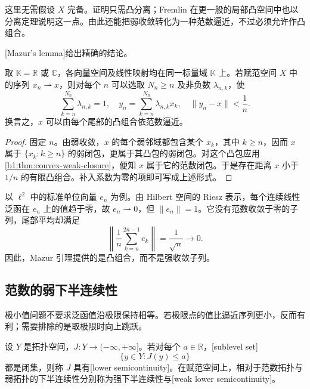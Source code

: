 这里无需假设 \(X\) 完备。证明只需凸分离；Fremlin 在更一般的局部凸空间中也以分离定理说明这一点\cite[Volume 4, 4A4Eb and 4A4Ed]{Fremlin2016Measure}。由此还能把弱收敛转化为一种范数逼近，不过必须允许作凸组合。

\ProseParagraphBreak

[Mazur's lemma]给出精确的结论。

\begin{theorem}[Mazur 引理]
\label{b1:thm:mazur}
取 \(\mathbb K=\mathbb R\) 或 \(\mathbb C\)，各向量空间及线性映射均在同一标量域 \(\mathbb K\) 上。若赋范空间 \(X\) 中的序列 \(x_n\rightharpoonup x\)，则对每个 \(n\) 可以选取 \(N_n\geq n\) 及非负数 \(\lambda_{n,k}\)，使
\[
  \sum_{k=n}^{N_n}\lambda_{n,k}=1,
  \quad y_n=\sum_{k=n}^{N_n}\lambda_{n,k}x_k,
  \quad \|y_n-x\|<\frac1n.
\]
换言之，\(x\) 可以由每个尾部的凸组合依范数逼近。
\end{theorem}

\begin{proof}
固定 \(n\)。由弱收敛，\(x\) 的每个弱邻域都包含某个 \(x_k\)，其中 \(k\geq n\)，因而 \(x\) 属于 \(\{x_k:k\geq n\}\) 的弱闭包，更属于其凸包的弱闭包。对这个凸包应用\cref{b1:thm:convex-weak-closure}，便知 \(x\) 属于它的范数闭包。于是存在距离 \(x\) 小于 \(1/n\) 的有限凸组合。补入系数为零的项即可写成上述形式。
\end{proof}

以 \(\ell^2\) 中的标准单位向量 \(e_n\) 为例。由 Hilbert 空间的 Riesz 表示，每个连续线性泛函在 \(e_n\) 上的值趋于零，故 \(e_n\rightharpoonup0\)，但 \(\|e_n\|=1\)。它没有范数收敛于零的子列，尾部平均却满足
\[
  \left\|\frac1n\sum_{k=n}^{2n-1}e_k\right\|=\frac1{\sqrt n}
  \longrightarrow0.
\]
因此，Mazur 引理提供的是凸组合，而不是强收敛子列。

\subsection{范数的弱下半连续性}
\label{b1:subsec:090503}

极小值问题不要求泛函值沿极限保持相等。若极限点的值比逼近序列更小，反而有利；需要排除的是取极限时向上跳跃。

\begin{definition}[下半连续性]
\label{b1:def:lower-semicontinuity}
设 \(Y\) 是拓扑空间，\(J:Y\to(-\infty,+\infty]\)。若对每个 \(a\in\mathbb R\)，[sublevel set]
\[
  \{y\in Y:J(y)\leq a\}
\]
都是闭集，则称 \(J\) 具有[lower semicontinuity]。在赋范空间上，相对于范数拓扑与弱拓扑的下半连续性分别称为强下半连续性与[weak lower semicontinuity]。
\end{definition}

